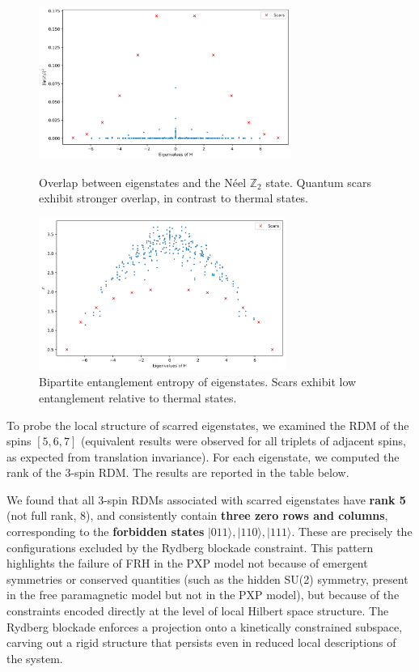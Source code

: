 \documentclass{article}
\begin{document}
\begin{figure}[h!]
  \centering
  \begin{minipage}[c]{0.45\textwidth}
    \centering
    \includegraphics[height=5cm]{pxp_neel.png}
    \caption{Overlap between eigenstates and the Néel \( \mathbb{Z}_2 \) state. Quantum scars exhibit stronger overlap, in contrast to thermal states.}
  \end{minipage}
  \hfill
  \begin{minipage}[c]{0.45\textwidth}
    \centering
    \includegraphics[height=5cm]{pxp_entanglement.png}
    \caption{Bipartite entanglement entropy of eigenstates. Scars exhibit low entanglement relative to thermal states.}
  \end{minipage}
  \label{fig:minipage-images}
\end{figure}

To probe the local structure of scarred eigenstates, we examined the RDM of the spins \([5,6,7]\) (equivalent results were observed for all triplets of adjacent spins, as expected from translation invariance). For each eigenstate, we computed the rank of the 3-spin RDM. The results are reported in the table below.

We found that all 3-spin RDMs associated with scarred eigenstates have \textbf{rank 5} (not full rank, 8), and consistently contain \textbf{three zero rows and columns}, corresponding to the \textbf{forbidden states} \( |011\rangle, |110\rangle, |111\rangle \). These are precisely the configurations excluded by the Rydberg blockade constraint.
This pattern highlights the failure of FRH in the PXP model not because of emergent symmetries or conserved quantities (such as the hidden SU(2) symmetry, present in the free paramagnetic model but not in the PXP model), but because of the constraints encoded directly at the level of local Hilbert space structure. The Rydberg blockade enforces a projection onto a kinetically constrained subspace, carving out a rigid structure that persists even in reduced local descriptions of the system.
\end{document}
